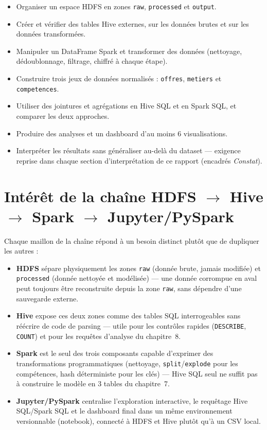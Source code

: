 \begin{itemize}[leftmargin=1.5em]
  \item Organiser un espace HDFS en zones \texttt{raw}, \texttt{processed}
    et \texttt{output}.
  \item Créer et vérifier des tables Hive externes, sur les données
    brutes et sur les données transformées.
  \item Manipuler un DataFrame Spark et transformer des données
    (nettoyage, dédoublonnage, filtrage, chiffré à chaque étape).
  \item Construire trois jeux de données normalisés : \texttt{offres},
    \texttt{metiers} et \texttt{competences}.
  \item Utiliser des jointures et agrégations en Hive SQL et en Spark
    SQL, et comparer les deux approches.
  \item Produire des analyses et un dashboard d'au moins 6
    visualisations.
  \item Interpréter les résultats sans généraliser au-delà du dataset —
    exigence reprise dans chaque section d'interprétation de ce rapport
    (encadrés \emph{Constat}).
\end{itemize}

\section{\texorpdfstring{Intérêt de la chaîne HDFS $\to$ Hive $\to$ Spark $\to$ Jupyter/PySpark}{Intérêt de la chaîne HDFS - Hive - Spark - Jupyter/PySpark}}

Chaque maillon de la chaîne répond à un besoin distinct plutôt que de
dupliquer les autres :

\begin{itemize}[leftmargin=1.5em]
  \item \textbf{HDFS} sépare physiquement les zones \texttt{raw}
    (donnée brute, jamais modifiée) et \texttt{processed} (donnée
    nettoyée et modélisée) — une donnée corrompue en aval peut toujours
    être reconstruite depuis la zone \texttt{raw}, sans dépendre d'une
    sauvegarde externe.
  \item \textbf{Hive} expose ces deux zones comme des tables SQL
    interrogeables sans réécrire de code de parsing — utile pour les
    contrôles rapides (\texttt{DESCRIBE}, \texttt{COUNT}) et pour les
    requêtes d'analyse du chapitre~8.
  \item \textbf{Spark} est le seul des trois composants capable
    d'exprimer des transformations programmatiques (nettoyage,
    \texttt{split}/\texttt{explode} pour les compétences, hash
    déterministe pour les clés) — Hive SQL seul ne suffit pas à
    construire le modèle en 3 tables du chapitre~7.
  \item \textbf{Jupyter/PySpark} centralise l'exploration interactive,
    le requêtage Hive SQL/Spark SQL et le dashboard final dans un
    même environnement versionnable (notebook), connecté à HDFS et
    Hive plutôt qu'à un CSV local.
\end{itemize}

